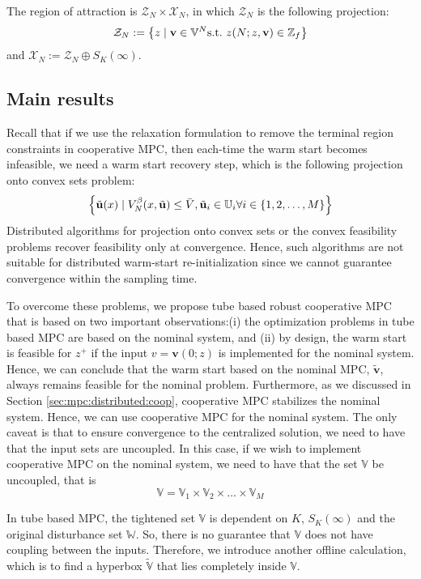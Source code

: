 The region of attraction is $\mathcal{Z}_N \times \mathcal{X}_N$, in
which $\mathcal{Z}_N$ is the following projection:
\[ \mathcal{Z}_N : = \left\lbrace z \mid \mathbf{v} \in \mathbb{V}^N \text{s.t.~}
  z(N;z,\mathbf{v}) \in \mathbb{Z}_f \right\rbrace\]
and $\mathcal{X}_N := \mathcal{Z}_N \oplus S_K(\infty)$.

\subsection{Main results}
Recall that if we use the relaxation formulation to remove the
terminal region constraints in cooperative MPC, then each-time the
warm start becomes infeasible, we need a warm start recovery step,
which is the following projection onto convex sets problem:
\[ \left\lbrace \tilde{\mathbf{u}}(x) \mid V_N^\beta(x,\tilde{\mathbf{u}})\leq \bar{V}, \tilde{\mathbf{u}}_i \in
  \mathbb{U}_i \forall i \in \left\lbrace 1,2,\ldots,M \right\rbrace \right\rbrace\]
Distributed algorithms for projection onto convex sets or the convex
feasibility problems recover feasibility only at convergence. Hence,
such algorithms are not suitable for distributed warm-start
re-initialization since we cannot guarantee convergence within the
sampling time. 

To overcome these problems, we propose tube based robust cooperative
MPC that is based on two important observations:(i)  the optimization problems in tube based MPC are based on the
  nominal system, and (ii) by design, the warm start is feasible for $z^+$ if the input $v
  = \mathbf{v}(0;z)$ is implemented for the nominal system. Hence, we
  can conclude that the warm start based on the nominal MPC, $\tilde{\mathbf{v}}$, always remains feasible for the nominal problem. Furthermore, as we
discussed in Section \ref{sec:mpc:distributed:coop}, cooperative MPC stabilizes
the nominal system. Hence, we can use cooperative MPC for the nominal
system. The only caveat is that to ensure convergence to the
centralized solution, we need to have that the input sets are
uncoupled. In this case, if we wish to implement cooperative MPC on
the nominal system, we need to have that the set $\mathbb{V}$ be
uncoupled, that is 
\[ \mathbb{V} = \mathbb{V}_1 \times \mathbb{V}_2 \times \ldots \times
\mathbb{V}_M \]

In tube based MPC, the tightened set $\mathbb{V}$ is dependent
on $K$, $S_K(\infty)$ and the original disturbance set $\mathbb{W}$. So,
there is no guarantee that $\mathbb{V}$ does not have coupling between
the inputs. Therefore, we introduce another offline calculation, which
is to find a hyperbox $\tilde{\mathbb{V}}$ that lies completely inside $\mathbb{V}$. 

